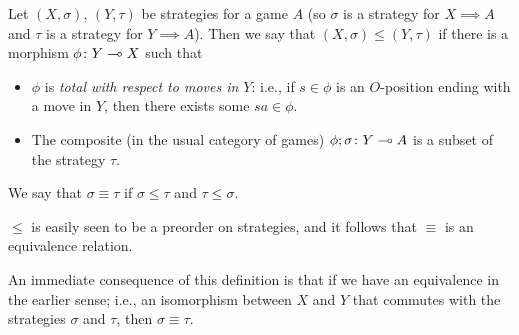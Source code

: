 \documentclass{article}
\begin{document}
\begin{definition}
  Let $(X,\sigma)$, $(Y, \tau)$ be strategies for a game $A$ (so $\sigma$ is a strategy for $X\implies A$ and $\tau$ is a strategy for $Y\implies A$).  
  Then we say that $(X,\sigma)\le(Y,\tau)$ if there is a morphism $\phi\colon Y\multimap X$ such that
  \begin{itemize}
    \item $\phi$ is \emph{total with respect to moves in $Y$}: i.e., if $s\in \phi$ is an $O$-position ending with a move in $Y$, then there exists some $sa\in\phi$.  
    \item The composite (in the usual category of games) $\phi;\sigma\colon Y\multimap A$ is a subset of the strategy $\tau$.  
  \end{itemize}

  We say that $\sigma\equiv\tau$ if $\sigma\le\tau$ and $\tau\le\sigma$.
\end{definition}

$\le$ is easily seen to be a preorder on strategies, and it follows that $\equiv$ is an equivalence relation.

An immediate consequence of this definition is that if we have an equivalence in the earlier sense; i.e., an isomorphism between $X$ and $Y$ that commutes with the strategies $\sigma$ and $\tau$, then $\sigma\equiv\tau$.  
\end{document}
